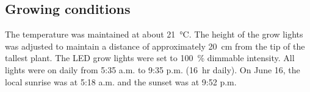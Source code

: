 \subsection{Growing conditions}

The temperature was maintained at about \qty[mode=text]{21}{\degreeCelsius}. The height of the grow lights was adjusted to maintain a distance of approximately \qty[mode=text]{20}{\cm} from the tip of the tallest plant. The LED grow lights were set to \qty[mode=text]{100}{\percent} dimmable intensity. All lights were on daily from 5:35 a.m. to 9:35 p.m. (\qty[mode=text]{16}{hr} daily). On June 16, the local sunrise was at 5:18 a.m. and the sunset was at 9:52 p.m.